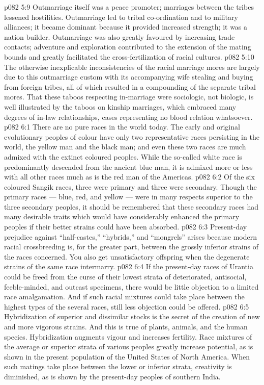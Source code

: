 \vs p082 5:9 Outmarriage itself was a peace promoter; marriages between the tribes lessened hostilities. Outmarriage led to tribal co\hyp{}ordination and to military alliances; it became dominant because it provided increased strength; it was a nation builder. Outmarriage was also greatly favoured by increasing trade contacts; adventure and exploration contributed to the extension of the mating bounds and greatly facilitated the cross\hyp{}fertilization of racial cultures.
\vs p082 5:10 The otherwise inexplicable inconsistencies of the racial marriage mores are largely due to this outmarriage custom with its accompanying wife stealing and buying from foreign tribes, all of which resulted in a compounding of the separate tribal mores. That these taboos respecting in\hyp{}marriage were sociologic, not biologic, is well illustrated by the taboos on kinship marriages, which embraced many degrees of in\hyp{}law relationships, cases representing no blood relation whatsoever.
\vs p082 6:1 There are no pure races in the world today. The early and original evolutionary peoples of colour have only two representative races persisting in the world, the yellow man and the black man; and even these two races are much admixed with the extinct coloured peoples. While the so\hyp{}called white race is predominantly descended from the ancient blue man, it is admixed more or less with all other races much as is the red man of the Americas.
\vs p082 6:2 Of the six coloured Sangik races, three were primary and three were secondary. Though the primary races --- blue, red, and yellow --- were in many respects superior to the three secondary peoples, it should be remembered that these secondary races had many desirable traits which would have considerably enhanced the primary peoples if their better strains could have been absorbed.
\vs p082 6:3 Present\hyp{}day prejudice against “half\hyp{}castes,” “hybrids,” and “mongrels” arises because modern racial crossbreeding is, for the greater part, between the grossly inferior strains of the races concerned. You also get unsatisfactory offspring when the degenerate strains of the same race intermarry.
\vs p082 6:4 If the present\hyp{}day races of Urantia could be freed from the curse of their lowest strata of deteriorated, antisocial, feeble\hyp{}minded, and outcast specimens, there would be little objection to a limited race amalgamation. And if such racial mixtures could take place between the highest types of the several races, still less objection could be offered.
\vs p082 6:5 Hybridization of superior and dissimilar stocks is the secret of the creation of new and more vigorous strains. And this is true of plants, animals, and the human species. Hybridization augments vigour and increases fertility. Race mixtures of the average or superior strata of various peoples greatly increase  potential, as is shown in the present population of the United States of North America. When such matings take place between the lower or inferior strata, creativity is diminished, as is shown by the present\hyp{}day peoples of southern India.
